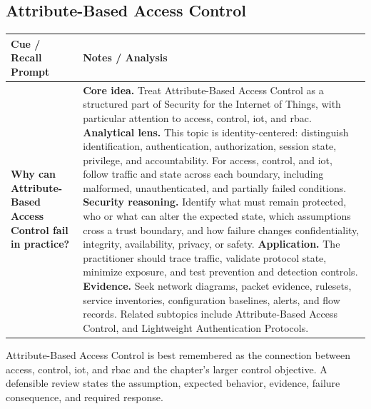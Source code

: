 \documentclass[11pt]{article}
\newcommand{\CornellHeader}{%
\rowcolor{Navy}\color{white}\bfseries Cue / Recall Prompt & \color{white}\bfseries Notes / Analysis\\\hline}
\newcommand{\CornellRow}[2]{%
\cellcolor{CueGray}\RaggedRight\textbf{#1} & \RaggedRight #2\\\hline}
\begin{document}
\subsection*{Attribute-Based Access Control}
\begin{longtable}{>{\RaggedRight\arraybackslash}p{}|>{\RaggedRight\arraybackslash}p{}}
\CornellHeader
\CornellRow{Why can Attribute-Based Access Control fail in practice?}{\textbf{Core idea.} Treat Attribute-Based Access Control as a structured part of Security for the Internet of Things, with particular attention to access, control, iot, and rbac. \textbf{Analytical lens.} This topic is identity-centered: distinguish identification, authentication, authorization, session state, privilege, and accountability. For access, control, and iot, follow traffic and state across each boundary, including malformed, unauthenticated, and partially failed conditions. \textbf{Security reasoning.} Identify what must remain protected, who or what can alter the expected state, which assumptions cross a trust boundary, and how failure changes confidentiality, integrity, availability, privacy, or safety. \textbf{Application.} The practitioner should trace traffic, validate protocol state, minimize exposure, and test prevention and detection controls. \textbf{Evidence.} Seek network diagrams, packet evidence, rulesets, service inventories, configuration baselines, alerts, and flow records. Related subtopics include Attribute-Based Access Control, and Lightweight Authentication Protocols.}
\end{longtable}
\begin{topicsummary}
Attribute-Based Access Control is best remembered as the connection between access, control, iot, and rbac and the chapter's larger control objective. A defensible review states the assumption, expected behavior, evidence, failure consequence, and required response.
\end{topicsummary}
\end{document}
